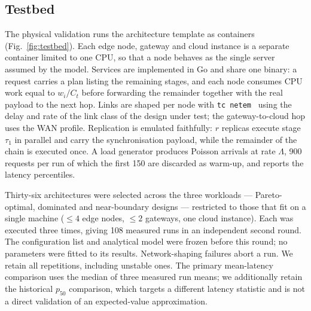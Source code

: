 \documentclass[preprint,11pt,3p]{elsarticle}
\theoremstyle{plain}
\theoremstyle{definition}
\begin{document}
\subsection{Testbed}
\label{sec:testbed}
The physical validation runs the architecture template as containers
(Fig.~\ref{fig:testbed}). Each edge node, gateway and cloud instance is a separate
container limited to one CPU, so that a node behaves as the single server assumed by the
model. Services are implemented in Go and share one binary: a request carries a plan
listing the remaining stages, and each node consumes CPU work equal to $w_i/C_t$ before
forwarding the remainder together with the real payload to the next hop. Links are shaped
per node with \texttt{tc netem}~\cite{hemminger2005netem} using the delay and rate of the
link class of the design under test; the gateway-to-cloud hop uses the WAN profile.
Replication is emulated faithfully: $r$ replicas execute stage $\tau_1$ in parallel and
carry the synchronisation payload, while the remainder of the chain is executed once.
A load generator produces Poisson arrivals at rate $\Lambda$, 900 requests per run of
which the first 150 are discarded as warm-up, and reports the latency percentiles.

Thirty-six architectures were selected across the three workloads --- Pareto-optimal,
dominated and near-boundary designs --- restricted to those that fit on a single machine
($\le4$ edge nodes, $\le2$ gateways, one cloud instance). Each was executed three times,
giving 108 measured runs in an independent second round. The configuration list and
analytical model were frozen before this round; no parameters were fitted to its results.
Network-shaping failures abort a run. We retain all repetitions, including unstable ones.
The primary mean-latency comparison uses the median of three measured run means;
we additionally retain the historical $p_{50}$ comparison, which targets a different latency
statistic and is not a direct validation of an expected-value approximation.
\end{document}
